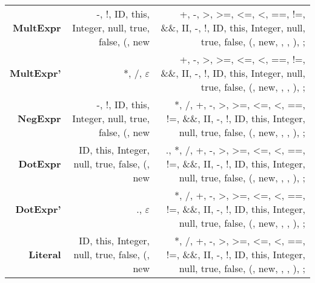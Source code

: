 \documentclass{report}
\begin{document}
\begin{tabularx}{\textwidth}{ r | R | R }
\textbf{MultExpr} 
& -, !, ID, this, Integer, null, true, false, (, new 
&  +, -, >, >=, <=, <, ==, !=, \&\&, II, -, !, ID, this, Integer, null, true, false, (, new, , , ), ; 
\\[1ex]

\textbf{MultExpr'} 
& *, /, $\varepsilon$ 
&  +, -, >, >=, <=, <, ==, !=, \&\&, II, -, !, ID, this, Integer, null, true, false, (, new, , , ), ;  
\\[1ex]

\textbf{NegExpr} 
&  -, !, ID, this, Integer, null, true, false, (, new 
&  *, /, +, -, >, >=, <=, <, ==, !=, \&\&, II, -, !, ID, this, Integer, null, true, false, (, new, , , ), ; 
\\[1ex]

\textbf{DotExpr} 
& ID, this, Integer, null, true, false, (, new 
&  ., *, /, +, -, >, >=, <=, <, ==, !=, \&\&, II, -, !, ID, this, Integer, null, true, false, (, new, , , ), ; 
\\[1ex]

\textbf{DotExpr'} 
& ., $\varepsilon$ 
& *, /, +, -, >, >=, <=, <, ==, !=, \&\&, II, -, !, ID, this, Integer, null, true, false, (, new, , , ), ; 
\\[1ex]

\textbf{Literal} 
& ID, this, Integer, null, true, false, (, new 
& *, /, +, -, >, >=, <=, <, ==, !=, \&\&, II, -, !, ID, this, Integer, null, true, false, (, new, , , ), ; 
\\[1ex]

\hline


\end{tabularx}
\end{document}
